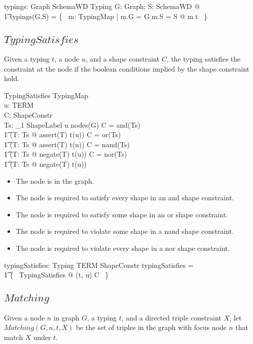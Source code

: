 \documentclass{article}
\begin{document}
\begin{axdef}
	typings: Graph \cross SchemaWD \fun \power Typing
\where
	\forall G: Graph; S: SchemaWD @ \\
\t1		typings(G,S) = \{~ m: TypingMap | m.G = G \land m.S = S @ m.t ~\}
\end{axdef}

\subsection{$TypingSatisfies$}
Given a typing $t$, a node $u$, and a shape constraint $C$, the typing satisfies the constraint at the node if the 
boolean conditions implied by the shape constraint hold.

\begin{schema}{TypingSatisfies}
	TypingMap \\
	u: TERM \\
	C: ShapeConstr \\
	Ts: \seq_1 ShapeLabel
\where
	u \in nodes(G)
\also
	C = and(Ts) \implies \\
\t1		(\forall T: \ran Ts @ assert(T) \in t(u))
\also
	C = or(Ts) \implies \\
\t1		(\exists T: \ran Ts @ assert(T) \in t(u))
\also
	C = nand(Ts) \implies \\
\t1		(\exists T: \ran Ts @ negate(T) \in t(u))
\also
	C = nor(Ts) \implies \\
\t1		(\forall T: \ran Ts @ negate(T) \in t(u))
\end{schema}
\begin{itemize}
\item The node is in the graph.
\item The node is required to satisfy every shape in an and shape constraint.
\item The node is required to satisfy some shape in an or shape constraint.
\item The node is required to violate some shape in a nand shape constraint.
\item The node is required to violate every shape in a nor shape constraint.
\end{itemize}

\begin{axdef}
	typingSatisfies: Typing \cross TERM \rel ShapeConstr
\where
	typingSatisfies = \\
\t1		\{~ TypingSatisfies @ (t, u) \mapsto C ~\}
\end{axdef}

\subsection{$Matching$}
Given a node $n$ in graph $G$, a typing $t$, and a directed triple constraint $X$, let $Matching(G,n,t,X)$ be the set of triples in the graph with focus node $n$ that match $X$ under $t$.
\end{document}
